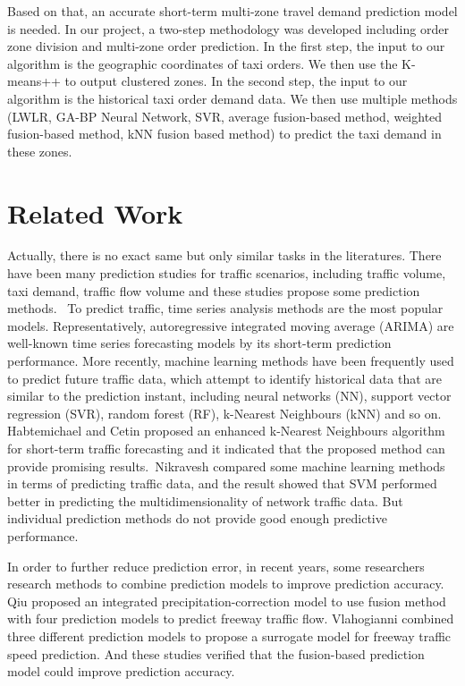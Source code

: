 \documentclass[sigconf]{acmart}
\begin{document}
Based on that, an accurate short-term multi-zone travel demand prediction model is needed. In our project, a two-step methodology was developed including order zone division and multi-zone order prediction. In the first step, the input to our algorithm is the geographic coordinates of taxi orders. We then use the K-means++ to output clustered zones. In the second step, the input to our algorithm is the historical taxi order demand data. We then use multiple methods (LWLR, GA-BP Neural Network, SVR, average fusion-based method, weighted fusion-based method, kNN fusion based method) to predict the taxi demand in these zones. 
\section{Related Work}
Actually, there is no exact same but only similar tasks in the literatures. There have been many prediction studies for traffic scenarios, including traffic volume, taxi demand, traffic flow volume and these studies propose some prediction methods. 
To predict traffic, time series analysis methods are the most popular models. Representatively, autoregressive integrated moving average (ARIMA) are well-known time series forecasting models by its short-term prediction performance\cite{li2012prediction}. More recently, machine learning methods have been frequently used to predict future traffic data, which attempt to identify historical data that are similar to the prediction instant, including neural networks (NN), support vector regression (SVR), random forest (RF), k-Nearest Neighbours (kNN) and so on. Habtemichael and Cetin\cite{habtemichael2016short} proposed an enhanced k-Nearest Neighbours algorithm for short-term traffic forecasting and it indicated that the proposed method can provide promising results. Nikravesh\cite{nikravesh2016mobile} compared some machine learning methods in terms of predicting traffic data, and the result showed that SVM performed better in predicting the multidimensionality of network traffic data. But individual prediction methods do not provide good enough predictive performance.

In order to further reduce prediction error, in recent years, some researchers research methods to combine prediction models to improve prediction accuracy\cite{guo2017influence}. Qiu proposed an integrated precipitation-correction model to use fusion method with four prediction models to predict freeway traffic flow\cite{qiu2016integrated}. Vlahogianni\cite{vlahogianni2015optimization} combined three different prediction models to propose a surrogate model for freeway traffic speed prediction. And these studies verified that the fusion-based prediction model could improve prediction accuracy. 
\end{document}
